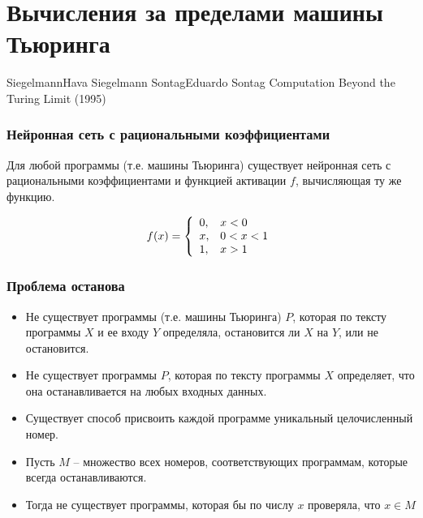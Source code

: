 \documentclass[24pt,pdf,hyperref={unicode},aspectratio=169]{beamer}
\begin{document}
\section{Вычисления за пределами машины Тьюринга}

\begin{frame}
\doublebio
{Siegelmann}{Hava Siegelmann}
{Sontag}{Eduardo Sontag}
{
Computation Beyond the Turing Limit (1995)
}
\end{frame}

\begin{frame}\frametitle{Нейронная сеть с рациональными коэффициентами}

Для любой программы (т.е. машины Тьюринга) существует нейронная сеть с рациональными коэффициентами и функцией активации $f$, вычисляющая ту же функцию.

$$
f(x)=\left\{\begin{array}{l l}
0, & x<0 \\
x, & 0<x<1 \\
1, & x>1
\end{array}
\right.
$$

\end{frame}

\begin{frame}\frametitle{Проблема останова}
\begin{itemize}
\item Не существует программы (т.е. машины Тьюринга) $P$, которая по тексту программы $X$ и ее входу $Y$ определяла, остановится ли $X$ на $Y$, или не остановится.
\item Не существует программы $P$, которая по тексту программы $X$ определяет, что она останавливается на любых входных данных.
\item Существует способ присвоить каждой программе уникальный целочисленный номер.
\item Пусть $M$ -- множество всех номеров, соответствующих программам, которые всегда останавливаются.
\item Тогда не существует программы, которая бы по числу $x$ проверяла, что $x\in M$
\end{itemize}
\end{frame}
\end{document}
